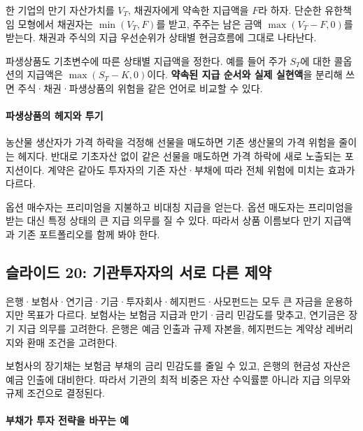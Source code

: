 \documentclass[11pt,a4paper]{article}
\begin{document}
한 기업의 만기 자산가치를 $V_T$, 채권자에게 약속한 지급액을 $F$라 하자. 단순한 유한책임 모형에서 채권자는 $\min(V_T,F)$를 받고, 주주는 남은 금액 $\max(V_T-F,0)$를 받는다. 채권과 주식의 지급 우선순위가 상태별 현금흐름에 그대로 나타난다.
\par

파생상품도 기초변수에 따른 상태별 지급액을 정한다. 예를 들어 주가 $S_T$에 대한 콜옵션의 지급액은 $\max(S_T-K,0)$이다. \textbf{약속된 지급 순서와 실제 실현액}을 분리해 쓰면 주식·채권·파생상품의 위험을 같은 언어로 비교할 수 있다.
\par

\paragraph{파생상품의 헤지와 투기}

농산물 생산자가 가격 하락을 걱정해 선물을 매도하면 기존 생산물의 가격 위험을 줄이는 헤지다. 반대로 기초자산 없이 같은 선물을 매도하면 가격 하락에 새로 노출되는 포지션이다. 계약은 같아도 투자자의 기존 자산·부채에 따라 전체 위험에 미치는 효과가 다르다.
\par

옵션 매수자는 프리미엄을 지불하고 비대칭 지급을 얻는다. 옵션 매도자는 프리미엄을 받는 대신 특정 상태의 큰 지급 의무를 질 수 있다. 따라서 상품 이름보다 만기 지급액과 기존 포트폴리오를 함께 봐야 한다.
\par

\subsection{슬라이드 20: 기관투자자의 서로 다른 제약}

은행·보험사·연기금·기금·투자회사·헤지펀드·사모펀드는 모두 큰 자금을 운용하지만 목표가 다르다. 보험사는 보험금 지급과 만기·금리 민감도를 맞추고, 연기금은 장기 지급 의무를 고려한다. 은행은 예금 인출과 규제 자본을, 헤지펀드는 계약상 레버리지와 환매 조건을 고려한다.
\par

보험사의 장기채는 보험금 부채의 금리 민감도를 줄일 수 있고, 은행의 현금성 자산은 예금 인출에 대비한다. 따라서 기관의 최적 비중은 자산 수익률뿐 아니라 지급 의무와 규제 조건으로 결정된다.
\par

\paragraph{부채가 투자 전략을 바꾸는 예}
\end{document}
